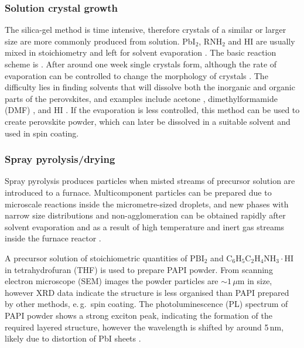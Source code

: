 \subsubsection{Solution crystal growth}
\label{sec:solutiongrowth}
The silica-gel method is time intensive, therefore crystals of a similar or larger size are more commonly produced from solution. Pb$\textrm{I}_2$, R$\textrm{NH}_2$ and HI are usually mixed in stoichiometry and left for solvent evaporation \cite{Kitazawa1996, Tang2001, Ishihara1994}. The basic reaction scheme is . After around one week single crystals form, although the rate of evaporation can be controlled to change the morphology of crystals \cite{Cheng2010}. The difficulty lies in finding solvents that will dissolve both the inorganic and organic parts of the perovskites, and examples include acetone \cite{Hong1992}, dimethylformamide (DMF) \cite{Kitazawa1996}, and HI \cite{Barman2003}. If the evaporation is less controlled, this method can be used to create perovskite powder, which can later be dissolved in a suitable solvent and used in spin coating.

\subsubsection {Spray pyrolysis/drying}
Spray pyrolysis produces particles when misted streams of precursor solution are introduced to a furnace. Multicomponent particles can be prepared due to microscale reactions inside the micrometre-sized droplets, and new phases with narrow size distributions and non-agglomeration can be obtained rapidly after solvent evaporation and as a result of high temperature and inert gas streams inside the furnace reactor \cite{Cheng2005}. 

A precursor solution of stoichiometric quantities of $\textrm{PBI}_2$ and $\textrm{C}_6\textrm{H}_5\textrm{C}_2\textrm{H}_4\textrm{NH}_3\cdot\textrm{HI}$ in tetrahydrofuran (THF) is used to prepare PAPI powder. From scanning electron microscope (SEM) images the powder particles are $\sim 1\, \mu$m in size, however XRD data indicate the structure is less organised than PAPI prepared by other methods, e.\,g.\, spin coating. The photoluminescence (PL) spectrum of PAPI powder shows a strong exciton peak, indicating the formation of the required layered structure, however the wavelength is shifted by around 5\,nm, likely due to distortion of PbI sheets \cite{Cheng2005}.

